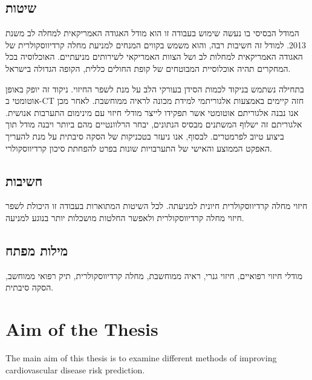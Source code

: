 \documentclass[a4paper,12pt]{article}
\begin{document}
\begin{hebrew}
		\subsection{\texthebrew{שיטות}}
		
		המודל הבסיסי בו נעשה שימוש בעבודה זו הוא מודל האגודה האמריקאית למחלה לב משנת 2013\cite{Goff2014}. למודל זה חשיבות רבה, והוא משמש בקווים המנחים למניעת מחלה קרדיווסקולרית של האגודה האמריקאית למחלות לב ושל הצוות האמריקאי לשירותים מניעתיים\cite{Bibbins-Domingo2016}. האוכלוסיה בכל המחקרים תהיה אוכלוסיית המבוטחים של קופת החולים כללית, הקופה הגדולה בישראל.
		
		בתחילה נשתמש בניקוד לכמות הסידן בעורקי הלב על מנת לשפר החיזוי. ניקוד זה יופק באופן אוטומטי ב-CT חזה קיימים באמצעות אלגוריתמי למידת מכונה לראיה ממוחשבת. לאחר מכן אנו נבנה אלגוריתם אוטומטי אשר תפקידו לייצר מודלי חיזוי עם מינימום התערבות אנושית. אלגוריתם זה ישלוף המשתנים מבסיס הנתונים, יבחר הרלוונטיים מהם ביותר ויבנה מודל תוך ביצוע טיוב לפרמטרים. לבסוף, אנו ניעזר בטכניקות של הסקה סיבתית על מנת להעריך האפקט הממוצע והאישי של התערבויות שונות בפרט להפחתת סיכון קרדיווסקולרי.

		\subsection{\texthebrew{חשיבות}}
		
		חיזוי מחלה קרדיווסקולרית חיונית למניעתה. לכל השיטות המתוארות בעבודה זו היכולת לשפר חיזוי מחלה קרדיווסקולרית ולאפשר החלטות מושכלות יותר בנוגע למניעה. 
			
			\subsection{\texthebrew{מילות מפתח}}
			
			מודלי חיזוי רפואיים, חיזוי גנרי, ראיה ממוחשבת, מחלה קרדיווסקולרית, תיק רפואי ממוחשב, הסקה סיבתית.
		
	\end{hebrew}
	
	\section{Aim of the Thesis}
	
	The main aim of this thesis is to examine different methods of improving cardiovascular disease risk prediction.
	
\end{document}
